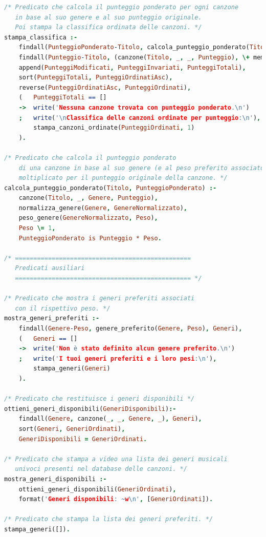 \documentclass[a4paper,11pt]{article}
\begin{document}
\begin{lstlisting}[language=Prolog]
/* Predicato che calcola il punteggio ponderato per ogni canzone 
   in base al suo genere e al suo punteggio originale.
   Poi stampa la classifica ordinata delle canzoni. */
stampa_classifica :-
    findall(PunteggioPonderato-Titolo, calcola_punteggio_ponderato(Titolo, PunteggioPonderato), PunteggiModificati),
    findall(Punteggio-Titolo, (canzone(Titolo, _, _, Punteggio), \+ member(_-Titolo, PunteggiModificati)), PunteggiInvariati),
    append(PunteggiModificati, PunteggiInvariati, PunteggiTotali),
    sort(PunteggiTotali, PunteggiOrdinatiAsc),
    reverse(PunteggiOrdinatiAsc, PunteggiOrdinati),
    (   PunteggiTotali == []
    ->  write('Nessuna canzone trovata con punteggio ponderato.\n')
    ;   write('\nClassifica delle canzoni ordinate per punteggio:\n'),
        stampa_canzoni_ordinate(PunteggiOrdinati, 1)
    ).

/* Predicato che calcola il punteggio ponderato
    di una canzone in base al suo genere (e al peso preferito associato)
    moltiplicato per il punteggio originale della canzone. */
calcola_punteggio_ponderato(Titolo, PunteggioPonderato) :- 
    canzone(Titolo, _, Genere, Punteggio),
    normalizza_genere(Genere, GenereNormalizzato),
    peso_genere(GenereNormalizzato, Peso),
    Peso \= 1,
    PunteggioPonderato is Punteggio * Peso.
    
/* ================================================
   Predicati ausiliari
   ================================================ */

/* Predicato che mostra i generi preferiti associati
   con il rispettivo peso. */
mostra_generi_preferiti :- 
    findall(Genere-Peso, genere_preferito(Genere, Peso), Generi),
    (   Generi == []
    ->  write('Non è stato definito alcun genere preferito.\n')
    ;   write('I tuoi generi preferiti e i loro pesi:\n'),
        stampa_generi(Generi)
    ).

/* Predicato che restituisce i generi disponibili */
ottieni_generi_disponibili(GeneriDisponibili):-
    findall(Genere, canzone(_, _, Genere, _), Generi),
    sort(Generi, GeneriOrdinati),
    GeneriDisponibili = GeneriOrdinati.

/* Predicato che stampa a video una lista dei generi musicali 
   univoci presenti nel database delle canzoni. */
mostra_generi_disponibili :-
    ottieni_generi_disponibili(GeneriOrdinati),
    format('Generi disponibili: ~w\n', [GeneriOrdinati]).
    
/* Predicato che stampa la lista dei generi preferiti. */
stampa_generi([]).


\end{lstlisting}
\end{document}
